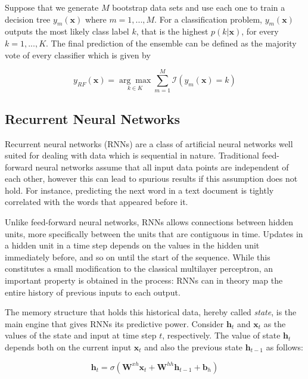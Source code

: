 \documentclass{kththesis}
\begin{document}
Suppose that we generate $M$ bootstrap data sets and use each one to train a decision tree $y_m(\mathbf{x})$ where $m=1,...,M$. For a classification problem, $y_m(\mathbf{x})$ outputs the most likely class label $k$, that is the highest $p(k|\mathbf{x})$, for every $k=1,...,K$. The final prediction of the ensemble can be defined as the majority vote of every classifier which is given by

\begin{equation}
y_\textit{RF}(\mathbf{x}) = \underset{k \in K}{\arg\max} \sum_{m=1}^M \mathcal{I}(y_m(\mathbf{x}) = k)
\end{equation}

\subsection{Recurrent Neural Networks}

Recurrent neural networks (RNNs) are a class of artificial neural networks well suited for dealing with data which is sequential in nature. Traditional feed-forward neural networks assume that all input data points are independent of each other, however this can lead to spurious results if this assumption does not hold. For instance, predicting the next word in a text document is tightly correlated with the words that appeared before it. 

Unlike feed-forward neural networks, RNNs allows connections between hidden units, more specifically between the units that are contiguous in time. Updates in a hidden unit in a time step depends on the values in the hidden unit immediately before, and so on until the start of the sequence. While this constitutes a small modification to the classical multilayer perceptron, an important property is obtained in the process: RNNs can in theory map the entire history of previous inputs to each output. 

The memory structure that holds this historical data, hereby called \emph{state}, is the main engine that gives RNNs its predictive power. Consider $\mathbf{h}_t$ and $\mathbf{x}_t$ as the values of the state and input at time step $t$, respectively. The value of state $\mathbf{h}_t$ depends both on the current input $\mathbf{x}_t$ and also the previous state $\mathbf{h}_{t-1}$ as follows:

\begin{equation}
\mathbf{h}_t = \sigma(\mathbf{W}^{xh}\mathbf{x}_t + \mathbf{W}^{hh}\mathbf{h}_{t-1} + \mathbf{b}_h)
\end{equation}
\end{document}
